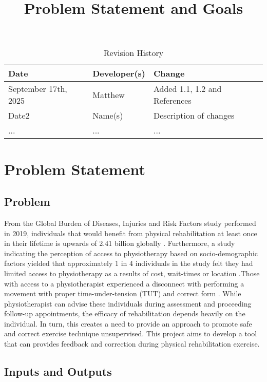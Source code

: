 \documentclass{article}
\title{Problem Statement and Goals\\\progname}
\author{\authname}
\date{}
\begin{document}
\maketitle

\begin{table}[hp]
\caption{Revision History} \label{TblRevisionHistory}
\begin{tabularx}{\textwidth}{llX}
\toprule
\textbf{Date} & \textbf{Developer(s)} & \textbf{Change}\\
\midrule
September 17th, 2025 & Matthew & Added 1.1, 1.2 and References\\
Date2 & Name(s) & Description of changes\\
... & ... & ...\\
\bottomrule
\end{tabularx}
\end{table}

\section{Problem Statement}

\subsection{Problem}

From the Global Burden of Diseases, Injuries and Risk Factors study performed in 2019, 
individuals that would benefit from physical rehabilitation at least once in their 
lifetime is upwards of 2.41 billion globally \citep{CiezaEtAl2021}.
Furthermore, a study indicating the perception of access to physiotherapy based on 
socio-demographic factors yielded that approximately 1 in 4 individuals in the study 
felt they had limited access to physiotherapy as a results of cost, wait-times or 
location \citep{BathEtAl2016}.Those with access to a physiotherapist experienced a 
disconnect with performing a movement with proper time-under-tension (TUT) and 
correct form \citep{FaberEtAl2015}. While physiotherapist can advise these individuals
during assessment and proceeding follow-up appointments, the efficacy of rehabilitation
depends heavily on the individual. In turn, this creates a need to provide an approach 
to promote safe and correct exercise technique unsupervised. This project aims to 
develop a tool that can provides feedback and correction during physical rehabilitation exercise.

\subsection{Inputs and Outputs}
\end{document}
